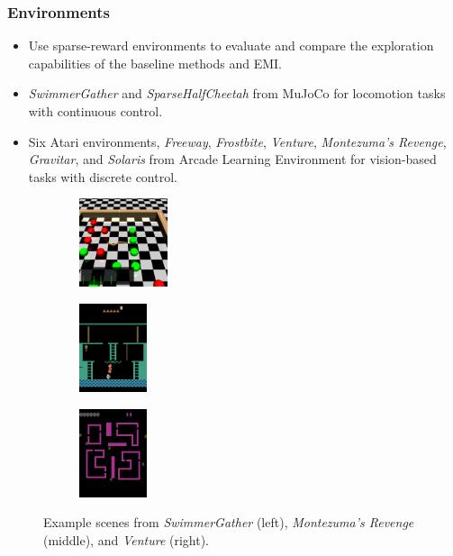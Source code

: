 \documentclass[10pt,mathserif]{beamer}
\begin{document}
\begin{frame}
\frametitle{Environments}
  \begin{itemize} \itemsep=6pt
    \item Use sparse-reward environments to evaluate and compare the exploration capabilities of the baseline methods and EMI.
    \item \textit{SwimmerGather} and \textit{SparseHalfCheetah} from MuJoCo for locomotion tasks with continuous control.
    \item Six Atari environments, \textit{Freeway}, \textit{Frostbite}, \textit{Venture}, \textit{Montezuma's Revenge}, \textit{Gravitar}, and \textit{Solaris} from Arcade Learning Environment for vision-based tasks with discrete control.
  \end{itemize}
  \pause
  \vspace{1em}
  
  \begin{figure}[h]
    \centering
    \begin{subfigure}[t]{0.3\textwidth}
        \centering
        \includegraphics[height=7em,right]{emi_figures/env_image_SwimmerGather.png}
    \end{subfigure}
    \begin{subfigure}[t]{0.3\textwidth}
        \centering
        \includegraphics[height=7em,center]{emi_figures/env_image_MontezumaRevenge.png}
    \end{subfigure}
    \begin{subfigure}[t]{0.3\textwidth}
        \centering
        \includegraphics[height=7em,left]{emi_figures/env_image_Venture.png}
    \end{subfigure}
    \caption{Example scenes from \textit{SwimmerGather} (left), \textit{Montezuma's Revenge} (middle), and \textit{Venture} (right).}
  \end{figure}

\end{frame}
\end{document}
